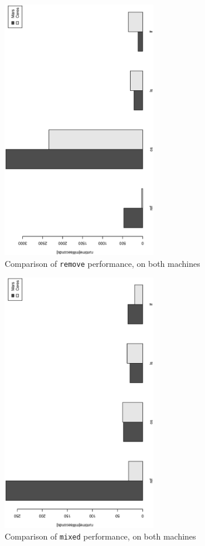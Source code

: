 \begin{figure}[H]
  \centering 
  \includegraphics[width=0.6\textwidth, angle=270]{pictures/throughput_remove.eps}
  \caption{Comparison of \texttt{remove} performance, on both machines}
  \label{removethrough}
\end{figure}

\begin{figure}[H]
  \centering 
  \includegraphics[width=0.6\textwidth, angle=270]{pictures/throughput_mixed.eps}
  \caption{Comparison of \texttt{mixed} performance, on both machines}
  \label{mixedthrough}
\end{figure}

